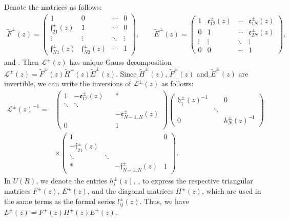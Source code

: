 \documentclass[pdftex]{sigma}
\numberwithin{equation}{section}
\begin{document}
Denote the matrices as follows:
\begin{align*}\widetilde{F}^{\pm}(z)=\left(
 \begin{matrix}
 1 & 0 & \cdots & 0 \\
 \mathfrak{f}_{21}^{\pm}(z) & 1 & \cdots & 0 \\
 \vdots & \vdots & \ddots & \vdots \\
 \mathfrak{f}_{N1}^{\pm}(z) & \mathfrak{f}_{N2}^{\pm}(z) & \cdots & 1
 \end{matrix}\right),\qquad
 \widetilde{E}^{\pm}(z)=\left(\begin{matrix}
 1 & \mathfrak{e}_{12}^{\pm}(z) & \cdots & \mathfrak{e}_{1N}^{\pm}(z) \\
 0 & 1 & \cdots & \mathfrak{e}_{2N}^{\pm}(z) \\
 \vdots & \vdots & \ddots & \vdots \\
 0& 0 & \cdots & 1
 \end{matrix}\right),
\end{align*}
and .
Then
$\mathcal{L}^{\pm}(z)$ has unique Gauss decomposition
$\mathcal{L}^{\pm}(z)=\widetilde{F}^{\pm}(z)\widetilde{H}^{\pm}(z)\widetilde{E}^{\pm}(z)$.
Since $\widetilde{H}^{\pm}(z)$, $\widetilde{F}^{\pm}(z)$ and $\widetilde{E}^{\pm}(z)$ are invertible, we can
write the inversions of $\mathcal{L}^{\pm}(z)$ as follows:
\begin{align*}
 \mathcal{L}^{\pm}(z)^{-1}={}&\left(
 \begin{matrix}
 1 & -\mathfrak{e}_{12}^{\pm}(z) & &* \\
 \ddots & \ddots& &\\
 & & & -\mathfrak{e}_{N-1,N}^{\pm}(z)\\
 0 & & &1
 \end{matrix}
 \right)\left(
 \begin{matrix}
 \mathfrak{h}_1^{\pm}(z)^{-1} & & 0 \\
 & \ddots & \\
 0 & & h_N^{\pm}(z)^{-1}
 \end{matrix}
 \right) \nonumber\\
 & \times\left(
 \begin{matrix}
 1 & & & 0 \\
 -\mathfrak{f}_{21}^{\pm}(z) & & & \\
 \ddots & \ddots & & \\
 *& & -\mathfrak{f}_{N-1,N}^{\pm}(z) & 1
 \end{matrix}
 \right).
\end{align*}
In $U(R)$, we denote the entries $h_i^{\pm}(z)$, ,  to express the respective triangular matrices $F^{\pm}(z)$, $E^{\pm}(z)$, and the diagonal matrices $H^{\pm}(z)$, which are used in the same terms as the formal series $l_{ij}^{\pm}(z)$. Thus, we have
$
 L^{\pm}(z)=F^{\pm}(z)H^{\pm}(z)E^{\pm}(z)$.
\end{document}
